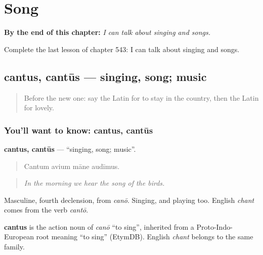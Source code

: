 
\chapter{Song}
\label{ch:la-song}

\begin{chapteropening}
\textbf{By the end of this chapter:} \emph{I can talk about singing and songs.}

Complete the last lesson of chapter 543: I can talk about singing and songs.
\end{chapteropening}

\section[cantus, cantūs]{cantus, cantūs — singing, song; music}

\label{lesson:LA-C543-cantus}



\begin{quote}
Before the new one: say the Latin for to stay in the country, then the Latin for lovely.
\end{quote}

\subsection*{You'll want to know: cantus, cantūs}
\textbf{cantus, cantūs} — \textquotedblleft{}singing, song; music\textquotedblright{}.

\begin{quote}
Cantum avium māne audīmus.
\end{quote}

\begin{quote}
\emph{In the morning we hear the song of the birds.}
\end{quote}

Masculine, fourth declension, from \emph{canō}. Singing, and playing too. English \emph{chant} comes from the verb \emph{cantō}.

\begin{cousinweb}
\textbf{cantus} is the action noun of \emph{canō} \textquotedblleft{}to sing\textquotedblright{}, inherited from a Proto-Indo-European root meaning \textquotedblleft{}to sing\textquotedblright{} (EtymDB). English \emph{chant} belongs to the same family.
\end{cousinweb}

